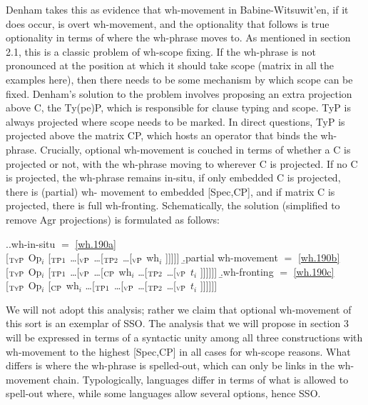 \documentclass{glossa}
\begin{document}
Denham takes this as evidence that wh-movement in Babine-Witsuwit'en, if it does occur, is overt wh-movement, and the optionality that follows is true optionality in terms of where the wh-phrase moves to. As mentioned in section 2.1, this is a classic problem of wh-scope fixing. If the wh-phrase is not pronounced at the position at which it should take scope (matrix in all the examples here), then there needs to be some mechanism by which scope can be fixed. Denham's solution to the problem involves proposing an extra projection above C, the Ty(pe)P, which is responsible for clause typing and scope. TyP is always projected where scope needs to be marked. In direct questions, TyP is projected above the matrix CP, which hosts an operator that binds the wh-phrase. Crucially, optional wh-movement is couched in terms of whether a C is projected or not, with the wh-phrase moving to wherever C is projected. If no C is projected, the wh-phrase remains in-situ, if only embedded C is projected, there is (partial) wh- movement to embedded [Spec,CP], and if matrix C is projected, there is full wh-fronting. Schematically, the solution (simplified to remove Agr projections) is formulated as follows:

\ex.\a.\label{wh.240a}wh-in-situ $=$ \ref{wh.190a}\\{}[$_{\textsc{TyP}}$ Op$_i$ [$_{\textsc{TP1}}$ \dots [$_{\textsc{vP}}$ \dots [$_{\textsc{TP2}}$ \dots [$_{\textsc{vP}}$ wh$_i$ ]]]]]\hspace{\fill}
   \b.\label{wh.240b}partial wh-movement $=$ \ref{wh.190b}\\{}[$_{\textsc{TyP}}$ Op$_i$ [$_{\textsc{TP1}}$ \dots [$_{\textsc{vP}}$ \dots [$_{\textsc{CP}}$ wh$_i$ \dots [$_{\textsc{TP2}}$ \dots [$_{\textsc{vP}}$ $t_i$ ]]]]]]\hspace{\fill}
   \b.\label{wh.240c}wh-fronting $=$ \ref{wh.190c}\\{}[$_{\textsc{TyP}}$ Op$_i$ [$_{\textsc{CP}}$ wh$_i$ \dots [$_{\textsc{TP1}}$ \dots [$_{\textsc{vP}}$ \dots [$_{\textsc{TP2}}$ \dots [$_{\textsc{vP}}$ $t_i$ ]]]]]]\hspace{\fill}\hspace{\fill}

We will not adopt this analysis; rather we claim that optional wh-movement of this sort is an exemplar of SSO. The analysis that we will propose in section 3 will be expressed in terms of a syntactic unity among all three constructions with wh-movement to the highest [Spec,CP] in all cases for wh-scope reasons. What differs is where the wh-phrase is spelled-out, which can only be links in the wh-movement chain. Typologically, languages differ in terms of what is allowed to spell-out where, while some languages allow several options, hence SSO.
\end{document}
